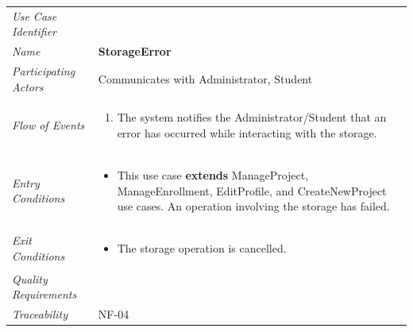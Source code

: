 \documentclass[12pt,letterpaper]{article}
\begin{document}
\begin{center}
	\begin{tabu} to 
		\toprule
		Use Case Identifier & \storageerror{} \\
		Name & {\bf StorageError} \\
		Participating Actors & Communicates with Administrator, Student \\
		Flow of Events & 
		\begin{minipage}[t]{\linewidth}
		    \begin{enumerate}
			    \item The system notifies the Administrator/Student that an error has occurred while interacting with the storage.
			\end{enumerate}
		\end{minipage} \\

		Entry Conditions &
		\begin{minipage}[t]{\linewidth}
			\begin{itemize}
			    \item This use case \textbf{extends} ManageProject, ManageEnrollment, EditProfile, and CreateNewProject use cases. An operation involving the storage has failed.
	        \end{itemize}
		\end{minipage} \\

		Exit Conditions &
		\begin{minipage}[t]{\linewidth}
			\begin{itemize}
			    \item The storage operation is cancelled.
	        \end{itemize}
		\end{minipage} \\

		Quality Requirements & \\

		Traceability & NF-04 \\
		\toprule
	\end{tabu}
\end{center}
\end{document}
